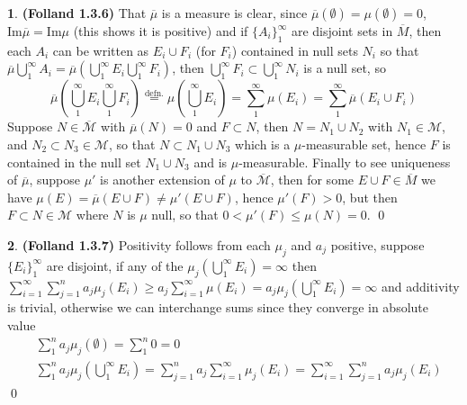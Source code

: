 \documentclass[10.5pt]{article}
\theoremstyle{definition}
\newtheorem{pb}{}
\newcommand{\set}[1]{\{#1\}}
\begin{document}
    \begin{pb}\textbf{(Folland 1.3.6)}
        That \(\overline{\mu}\) is a measure is clear, since \(\overline{\mu}(\emptyset) = \mu(\emptyset) = 0\), \(\text{Im}\overline{\mu} = \text{Im}\mu\) (this shows it is positive) and if \(\set{A_i}_1^\infty\) are disjoint sets in \(\overline{M}\), then each \(A_i\) can be written as \(E_i \cup F_i\) (for \(F_i\)) contained in null sets \(N_i\) so that \(\overline{\mu}\bigcup_1^\infty A_i = \overline{\mu}(\bigcup_1^\infty E_i \bigcup_1^\infty F_i)\), then \(\bigcup_1^\infty F_i \subset \bigcup_1^\infty N_i\) is a null set, so \[\overline{\mu}(\bigcup_1^\infty E_i\bigcup_1^\infty F_i) \overset{\text{defn.}}{=}\mu(\bigcup_1^\infty E_i) = \sum_1^\infty \mu(E_i) = \sum_1^\infty \overline{\mu}(E_i\cup F_i)\]
        Suppose \(N \in \overline{\mathcal{M}}\) with \(\overline{\mu}(N) = 0\) and \(F \subset N\), then \(N = N_1 \cup N_2\) with \(N_1 \in \mathcal{M}\), and \(N_2 \subset N_3 \in \mathcal{M}\), so that \(N \subset N_1 \cup N_3\) which is a \(\mu\)-measurable set, hence \(F\) is contained in the null set \(N_1 \cup N_3\) and is \(\mu\)-measurable. Finally to see uniqueness of \(\overline{\mu}\), suppose \(\mu'\) is another extension of \(\mu\) to \(\overline{\mathcal{M}}\), then for some \(E \cup F \in \overline{M}\) we have \(\mu(E) = \overline{\mu}(E \cup F) \neq \mu'(E\cup F)\), hence \(\mu'(F) > 0\), but then \(F \subset N \in \mathcal{M}\) where \(N\) is \(\mu\) null, so that \(0 < \mu'(F) \leq \mu(N) = 0\). \qed
    \end{pb}
    \begin{pb}\textbf{(Folland 1.3.7)}
        Positivity follows from each \(\mu_j\) and \(a_j\) positive, suppose \(\set{E_i}_1^\infty\) are disjoint, if any of the \(\mu_j(\bigcup_1^\infty E_i) = \infty\) then \(\sum_{i=1}^\infty\sum_{j=1}^n a_j\mu_j(E_i) \geq a_j \sum_{i=1}^\infty \mu(E_i) = a_j\mu_j(\bigcup_1^\infty E_i) = \infty\) and additivity is trivial, otherwise we can interchange sums since they converge in absolute value
        \begin{align*}
            &\sum_1^n a_j\mu_j(\emptyset) = \sum_1^n 0 = 0 \\
            &\sum_1^n a_j\mu_j(\bigcup_1^\infty E_i) = \sum_{j=1}^n a_j \sum_{i=1}^\infty \mu_j(E_i) = \sum_{i=1}^\infty \sum_{j=1}^n a_j\mu_j(E_i)
        \end{align*} \qed
    \end{pb}
\end{document}

